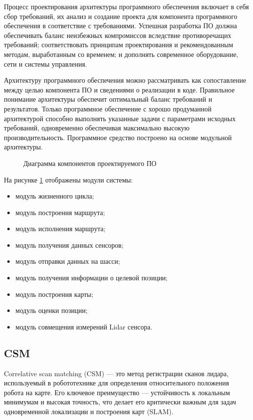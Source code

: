 Процесс проектирования архитектуры программного обеспечения включает в себя сбор
требований, их анализ и создание проекта для компонента программного
обеспечения в соответствие с требованиями. Успешная разработка ПО должна
обеспечивать баланс неизбежных компромиссов вследствие противоречащих
требований;  соответствовать  принципам  проектирования  и  рекомендованным
методам,  выработанным  со  временем;  и  дополнять  современное оборудование,
сети и системы управления. 

Архитектуру  программного  обеспечения  можно рассматривать  как  сопоставление
между целью компонента ПО и сведениями о реализации в коде. Правильное понимание
архитектуры  обеспечит  оптимальный баланс требований и результатов. Только
программное обеспечение с хорошо продуманной архитектурой способно выполнять
указанные задачи с параметрами исходных требований, одновременно обеспечивая
максимально высокую производительность. Программное средство построено на основе
модульной архитектуры. 

\FloatBarrier
\begin{figure}[H]
\centering
\caption{Диаграмма компонентов проектируемого ПО}
\label{fig:components}
\end{figure}

На рисунке \ref{fig:components} отображены модули системы:~
\begin{itemize}
	\item модуль жизненного цикла;
	\item модуль построения маршрута;
	\item модуль исполнения маршрута;
	\item модуль получения данных сенсоров;
	\item модуль отправки данных на шасси;
	\item модуль получения информации о целевой позиции;
	\item модуль построения карты;
	\item модуль оценки позиции;
	\item модуль совмещения измерений Lidar сенсора.
\end{itemize}

\subsection{CSM}
Correlative scan matching (CSM) — это метод регистрации сканов лидара, используемый в робототехнике для определения относительного положения робота на карте. Его ключевое преимущество — устойчивость к локальным минимумам и высокая точность, что делает его критически важным для задач одновременной локализации и построения карт (SLAM).

